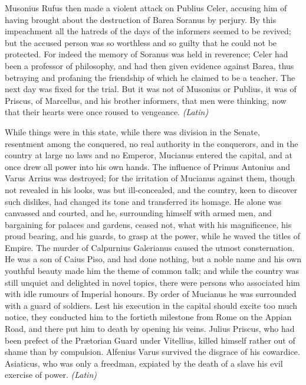 
Musonius Rufus then made a violent attack on Publius Celer, accusing him of having brought about the destruction of Barea Soranus by perjury. By this impeachment all the hatreds of the days of the informers seemed to be revived; but the accused person was so worthless and so guilty that he could not be protected. For indeed the memory of Soranus was held in reverence; Celer had been a professor of philosophy, and had then given evidence against Barea, thus betraying and profaning the friendship of which he claimed to be a teacher. The next day was fixed for the trial. But it was not of Musonius or Publius, it was of Priscus, of Marcellus, and his brother informers, that men were thinking, now that their hearts were once roused to vengeance. \emph{(Latin)}


While things were in this state, while there was division in the Senate, resentment among the conquered, no real authority in the conquerors, and in the country at large no laws and no Emperor, Mucianus entered the capital, and at once drew all power into his own hands. The influence of Primus Antonius and Varus Arrius was destroyed; for the irritation of Mucianus against them, though not revealed in his looks, was but ill-concealed, and the country, keen to discover such dislikes, had changed its tone and transferred its homage. He alone was canvassed and courted, and he, surrounding himself with armed men, and bargaining for palaces and gardens, ceased not, what with his magnificence, his proud bearing, and his guards, to grasp at the power, while he waved the titles of Empire. The murder of Calpurnius Galerianus caused the utmost consternation. He was a son of Caius Piso, and had done nothing, but a noble name and his own youthful beauty made him the theme of common talk; and while the country was still unquiet and delighted in novel topics, there were persons who associated him with idle rumours of Imperial honours. By order of Mucianus he was surrounded with a guard of soldiers. Lest his execution in the capital should excite too much notice, they conducted him to the fortieth milestone from Rome on the Appian Road, and there put him to death by opening his veins. Julius Priscus, who had been prefect of the Prætorian Guard under Vitellius, killed himself rather out of shame than by compulsion. Alfenius Varus survived the disgrace of his cowardice. Asiaticus, who was only a freedman, expiated by the death of a slave his evil exercise of power. \emph{(Latin)}

